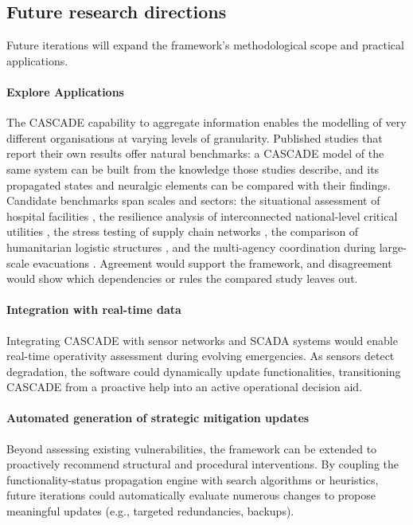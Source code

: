 \documentclass[review,12pt]{elsarticle}
\begin{document}
\subsection{Future research directions}
\label{subsec:future_work}
Future iterations will expand the framework's methodological scope and practical applications.

\paragraph{Explore Applications}
The CASCADE capability to aggregate information enables the modelling of very different organisations at varying levels of granularity. Published studies that report their own results offer natural benchmarks: a CASCADE model of the same system can be built from the knowledge those studies describe, and its propagated states and neuralgic elements can be compared with their findings. Candidate benchmarks span scales and sectors: the situational assessment of hospital facilities \cite{Grimaz2021}, the resilience analysis of interconnected national-level critical utilities \cite{Liu2017}, the stress testing of supply chain networks \cite{khakifirooz_assessing_2025}, the comparison of humanitarian logistic structures \cite{Liao2023}, and the multi-agency coordination during large-scale evacuations \cite{Harris2021}. Agreement would support the framework, and disagreement would show which dependencies or rules the compared study leaves out.

\paragraph{Integration with real-time data}
Integrating CASCADE with sensor networks and SCADA systems would enable real-time operativity assessment during evolving emergencies. As sensors detect degradation, the software could dynamically update functionalities, transitioning CASCADE from a proactive help into an active operational decision aid.

\paragraph{Automated generation of strategic mitigation updates}
Beyond assessing existing vulnerabilities, the framework can be extended to proactively recommend structural and procedural interventions. By coupling the functionality-status propagation engine with search algorithms or heuristics, future iterations could automatically evaluate numerous changes to propose meaningful updates (e.g., targeted redundancies, backups). 
\end{document}
